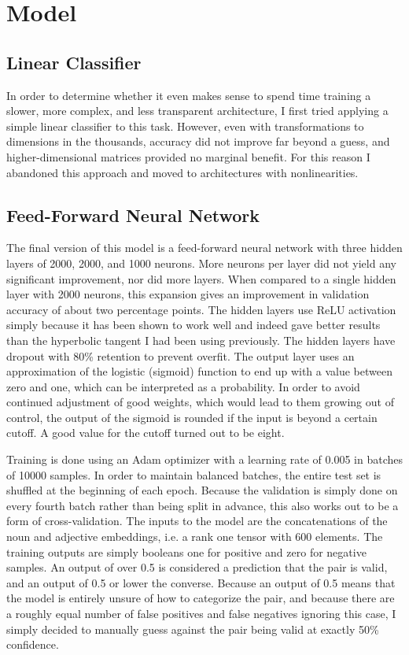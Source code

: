 \documentclass{article}
\begin{document}
\section{Model}

\subsection{Linear Classifier}
In order to determine whether it even makes sense to spend time training a slower, more complex, and less transparent architecture, I first tried applying a simple linear classifier to this task. However, even with transformations to dimensions in the thousands, accuracy did not improve far beyond a guess, and higher-dimensional matrices provided no marginal benefit. For this reason I abandoned this approach and moved to architectures with nonlinearities.

\subsection{Feed-Forward Neural Network}
The final version of this model is a feed-forward neural network with three hidden layers of 2000, 2000, and 1000 neurons. More neurons per layer did not yield any significant improvement, nor did more layers. When compared to a single hidden layer with 2000 neurons, this expansion gives an improvement in validation accuracy of about two percentage points. The hidden layers use ReLU activation simply because it has been shown to work well and indeed gave better results than the hyperbolic tangent I had been using previously. The hidden layers have dropout with 80\% retention to prevent overfit. The output layer uses an approximation of the logistic (sigmoid) function to end up with a value between zero and one, which can be interpreted as a probability. In order to avoid continued adjustment of good weights, which would lead to them growing out of control, the output of the sigmoid is rounded if the input is beyond a certain cutoff. A good value for the cutoff turned out to be eight.

Training is done using an Adam optimizer with a learning rate of 0.005 in batches of 10000 samples. In order to maintain balanced batches, the entire test set is shuffled at the beginning of each epoch. Because the validation is simply done on every fourth batch rather than being split in advance, this also works out to be a form of cross-validation. The inputs to the model are the concatenations of the noun and adjective embeddings, i.e. a rank one tensor with 600 elements. The training outputs are simply booleans \textemdash one for positive and zero for negative samples. An output of over 0.5 is considered a prediction that the pair is valid, and an output of 0.5 or lower the converse. Because an output of 0.5 means that the model is entirely unsure of how to categorize the pair, and because there are a roughly equal number of false positives and false negatives ignoring this case, I simply decided to manually guess against the pair being valid at exactly 50\% confidence.
\end{document}
